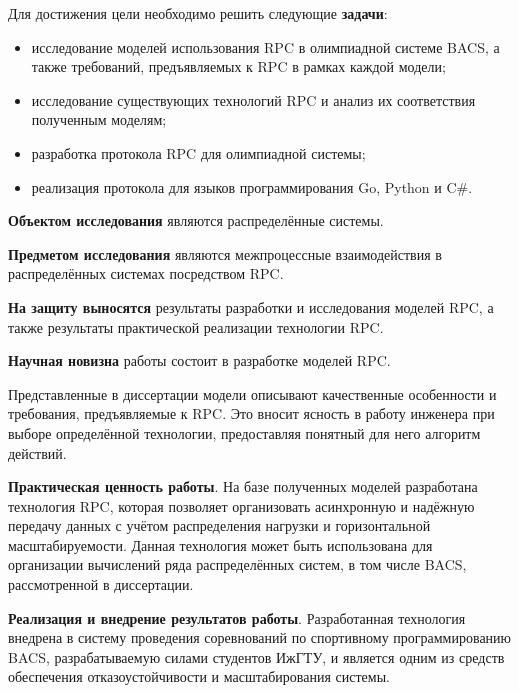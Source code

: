 Для достижения цели необходимо решить следующие \textbf{задачи}:
\begin{itemize}
    \item исследование моделей использования RPC в олимпиадной системе BACS,
        а также требований, предъявляемых к RPC в рамках каждой модели;
    \item исследование существующих технологий RPC и анализ их соответствия
        полученным моделям;
    \item разработка протокола RPC для олимпиадной системы;
    \item реализация протокола для языков программирования Go, Python и C\#.
\end{itemize}



\textbf{Объектом исследования} являются распределённые системы.

\textbf{Предметом исследования} являются межпроцессные взаимодействия
в распределённых системах посредством RPC.

\textbf{На защиту выносятся} результаты разработки и исследования моделей RPC,
а также результаты практической реализации технологии RPC.

\textbf{Научная новизна} работы состоит в разработке моделей RPC.

Представленные в диссертации модели описывают качественные особенности
и требования, предъявляемые к RPC. Это вносит ясность в работу инженера
при выборе определённой технологии, предоставляя понятный для него
алгоритм действий.

\textbf{Практическая ценность работы}. На базе полученных моделей
разработана технология RPC, которая позволяет организовать асинхронную
и надёжную передачу данных с учётом распределения нагрузки и горизонтальной
масштабируемости. Данная технология может быть использована для организации
вычислений ряда распределённых систем, в том числе BACS, рассмотренной
в диссертации.

\textbf{Реализация и внедрение результатов работы}. Разработанная технология
внедрена в систему проведения соревнований по спортивному программированию BACS,
разрабатываемую силами студентов ИжГТУ, и является одним из средств обеспечения
отказоустойчивости и масштабирования системы.

